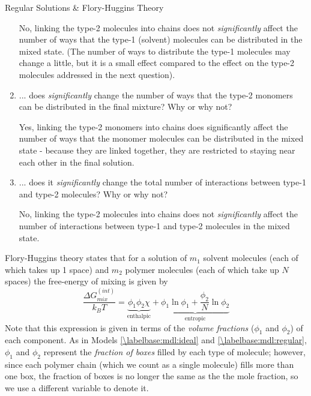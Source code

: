 \begin{activity}{Regular Solutions \& Flory-Huggins Theory}
\begin{ctqs}
\begin{enumerate}
				\begin{solution}[1in]{}
					No, linking the type-2 molecules into chains does not \emph{significantly} affect the number of ways that the type-1 (solvent) molecules can be distributed in the mixed state.  (The number of ways to distribute the type-1 molecules may change a little, but it is a small effect compared to the effect on the type-2 molecules addressed in the next question).
				\end{solution}
			
			\item ... does \emph{significantly} change the number of ways that the type-2 monomers can be distributed in the final mixture?  Why or why not?
				\label{\labelbase:ctq:FHtype2}
			
				\begin{solution}[1in]{}
					Yes, linking the type-2 monomers into chains does  significantly affect the number of ways that the monomer molecules can be distributed in the mixed state - because they are linked together, they are restricted to staying near each other in the final solution.
				\end{solution}
			
			\item ... does it \emph{significantly} change the total number of interactions between type-1 and type-2 molecules?  Why or why not?
				\label{\labelbase:ctq:FHinteraction}
			
				\begin{solution}[1in]{}
					No, linking the type-2 molecules into chains does not \emph{significantly} affect the number of interactions between type-1 and type-2 molecules in the mixed state.
				\end{solution}
				
		\end{enumerate}
	
\end{ctqs}

\begin{infobox}
	Flory-Huggins theory states that for a solution of $m_1$ solvent molecules (each of which takes up 1 space) and $m_2$ polymer molecules (each of which take up $N$ spaces) the free-energy of mixing is given by
	\begin{equation*}
		\frac{\Delta G_{mix}^{(int)}}{k_B T} = \underbrace{\phi_1 \phi_2 \chi}_{\text{enthalpic}} + \underbrace{\phi_1 \ln \phi_1 + \frac{\phi_2}{N} \ln \phi_2}_{\text{entropic}}
	\end{equation*}
	Note that this expression is given in terms of the \emph{volume fractions} ($\phi_1$ and $\phi_2$) of each component.  As in Models \ref{\labelbase:mdl:ideal} and \ref{\labelbase:mdl:regular}, $\phi_1$ and $\phi_2$ represent the \emph{fraction of boxes} filled by each type of molecule; however, since each polymer chain (which we count as a single molecule) fills more than one box, the fraction of boxes is no longer the same as the the mole fraction, so we use a different variable to denote it.
	

\end{infobox}
\end{activity}
